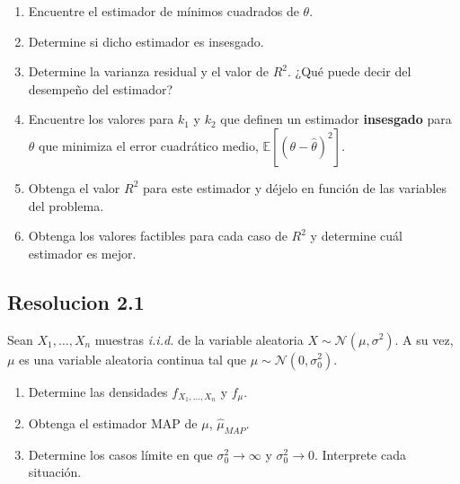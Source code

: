 \documentclass[
  11pt,
  letterpaper,
   addpoints,
  ]{exam}
\begin{document}
\begin{questions}
\begin{enumerate}
    \item Encuentre el estimador de mínimos cuadrados de $\theta$.
    \item Determine si dicho estimador es insesgado.
    \item Determine la varianza residual y el valor de $R^2$. ¿Qué puede decir del desempeño del estimador?
    \item Encuentre los valores para $k_1$ y $k_2$ que definen un estimador \textbf{insesgado} para $\theta$ que minimiza el error cuadrático medio, $\mathbb{E}[(\theta - \hat{\theta})^2]$.
    \item Obtenga el valor $R^2$ para este estimador y déjelo en función de las variables del problema.
    \item Obtenga los valores factibles para cada caso de $R^2$ y determine cuál estimador es mejor.
\end{enumerate}

\begin{solution}
    \subsection*{Resolucion 2.1}
\end{solution}
\question 
Sean $X_1, \dots, X_n$ muestras \textit{i.i.d.} de la variable aleatoria $X \sim \mathcal{N}(\mu, \sigma^2)$. A su vez, $\mu$ es una variable aleatoria continua tal que $\mu \sim \mathcal{N}(0, \sigma_0^2)$.

\begin{enumerate}
    \item Determine las densidades $f_{X_1, \dots, X_n}$ y $f_\mu$.
    \item Obtenga el estimador MAP de $\mu$, $\hat{\mu}_{MAP}$.
    \item Determine los casos límite en que $\sigma_0^2 \to \infty$ y $\sigma_0^2 \to 0$. Interprete cada situación.
\end{enumerate}
\end{questions}
\end{document}
